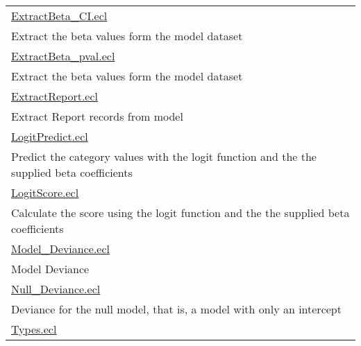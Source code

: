 {\begin{longtable}{|p{\textwidth}|}
\hline
\hyperlink{ecldoc:toc:LogisticRegression.ExtractBeta_CI}{ExtractBeta\_CI.ecl} \\
Extract the beta values form the model dataset \\
\hline
\hyperlink{ecldoc:toc:LogisticRegression.ExtractBeta_pval}{ExtractBeta\_pval.ecl} \\
Extract the beta values form the model dataset \\
\hline
\hyperlink{ecldoc:toc:LogisticRegression.ExtractReport}{ExtractReport.ecl} \\
Extract Report records from model \\
\hline
\hyperlink{ecldoc:toc:LogisticRegression.LogitPredict}{LogitPredict.ecl} \\
Predict the category values with the logit function and the the supplied beta coefficients \\
\hline
\hyperlink{ecldoc:toc:LogisticRegression.LogitScore}{LogitScore.ecl} \\
Calculate the score using the logit function and the the supplied beta coefficients \\
\hline
\hyperlink{ecldoc:toc:LogisticRegression.Model_Deviance}{Model\_Deviance.ecl} \\
Model Deviance \\
\hline
\hyperlink{ecldoc:toc:LogisticRegression.Null_Deviance}{Null\_Deviance.ecl} \\
Deviance for the null model, that is, a model with only an intercept \\
\hline
\hyperlink{ecldoc:toc:LogisticRegression.Types}{Types.ecl} \\
\hline
\end{longtable}
}



















